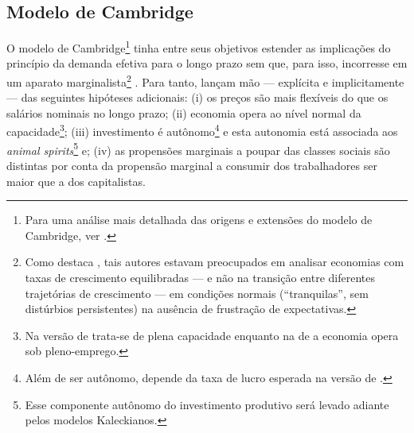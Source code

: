 \subsection{Modelo de Cambridge}
\label{Sec_Cambridge}


O modelo de Cambridge\footnote{Para uma análise mais detalhada das origens e extensões do modelo de Cambridge, ver \textcite{baranzini_cambridge_2013}.} tinha entre seus objetivos estender as implicações do princípio da demanda efetiva para o longo prazo sem que, para isso, incorresse em um aparato marginalista\footnote{
	Como destaca \textcite[p.~127--133]{davidson_accumulation_1978}, tais autores estavam preocupados em analisar economias com taxas de crescimento equilibradas --- e não na transição entre diferentes trajetórias de crescimento --- em condições normais (``tranquilas'', sem distúrbios persistentes) na ausência de frustração de expectativas.
} \cites{kaldor_alternative_1955}{kaldor_model_1957}{robinson_model_1962}{pasinetti_rate_1962}. 
Para tanto, lançam mão --- explícita e implicitamente --- das seguintes hipóteses adicionais: 
	(i) os preços são mais flexíveis do que os salários nominais no longo prazo; 
	(ii) economia opera ao nível normal da capacidade\footnote{
		Na versão de \textcite{robinson_model_1962} trata-se de plena capacidade enquanto na de \textcite{kaldor_alternative_1955} a economia opera sob pleno-emprego.
	}; 
	(iii) investimento é autônomo\footnote{Além de ser autônomo, depende da taxa de lucro esperada na versão de \textcite{robinson_model_1962}.} e esta autonomia está associada aos  \textit{animal spirits}\footnote{Esse componente autônomo do investimento produtivo será levado adiante pelos modelos Kaleckianos.} e;
	(iv) as propensões marginais a poupar das classes sociais são distintas por conta da propensão marginal a consumir dos trabalhadores ser maior que a dos capitalistas. 
	
